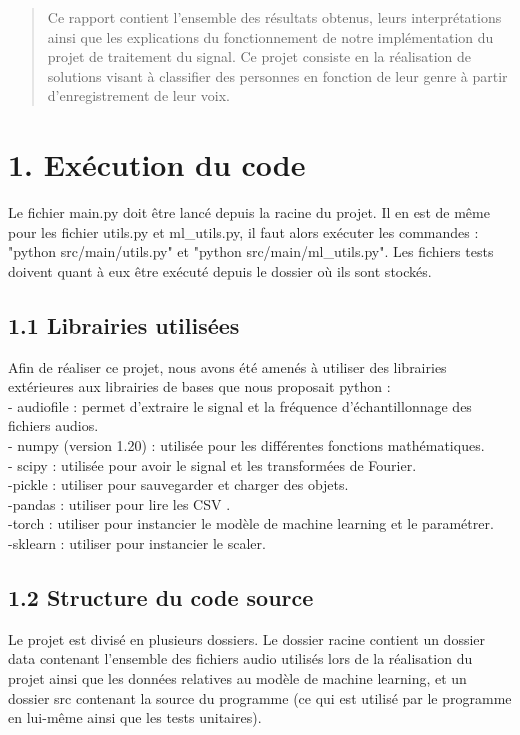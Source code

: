 \documentclass[a4paper,12pt]{report}	%
\begin{document}
\umonsCoverPage		%
	

\begin{abstract}
Ce rapport contient l'ensemble des résultats obtenus, leurs interprétations ainsi que les explications du fonctionnement de notre implémentation du projet de traitement du signal. Ce projet consiste en la réalisation de solutions visant à classifier des personnes en fonction de leur genre à partir d'enregistrement de leur voix.
\end{abstract}

\clearpage		
\tableofcontents

\clearpage		
{}

{\section*{1. Exécution du code}}
Le fichier main.py doit être lancé depuis la racine du projet. Il en est de même pour les fichier utils.py et ml\_utils.py, il faut alors exécuter les commandes : "python src/main/utils.py" et "python src/main/ml\_utils.py". Les fichiers tests doivent quant à eux être exécuté depuis le dossier où ils sont stockés.
{\subsection*{1.1 Librairies utilisées}}
Afin de réaliser ce projet, nous avons été amenés à utiliser des librairies extérieures aux librairies de bases que nous proposait python :\\
- audiofile : permet d'extraire le signal et la fréquence d'échantillonnage des fichiers audios.\\
- numpy (version 1.20) : utilisée pour les différentes fonctions mathématiques. \\
- scipy : utilisée pour avoir le signal et les transformées de Fourier. \\
-pickle : utiliser pour sauvegarder et charger des objets. \\
-pandas : utiliser pour lire les CSV .\\
-torch : utiliser pour instancier le modèle de machine learning et le paramétrer. \\
-sklearn : utiliser pour instancier le scaler. \\
{\subsection*{1.2 Structure du code source}}
Le projet est divisé en plusieurs dossiers. Le dossier racine contient un dossier data contenant l'ensemble des fichiers audio utilisés lors de la réalisation du projet ainsi que les données relatives au modèle de machine learning, et un dossier src contenant la source du programme (ce qui est utilisé par le programme en lui-même ainsi que les tests unitaires).
\end{document}
